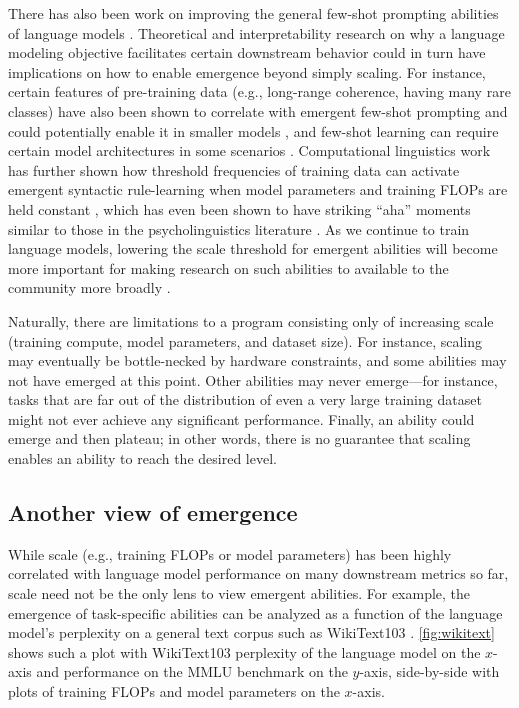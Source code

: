 There has also been work on improving the general few-shot prompting abilities of language models \citep[][\textit{inter alia}]{gao-etal-2021-making,schick-schutze-2021-just}. Theoretical and interpretability research \citep{wei2021pretrained,saunshi2020mathematical} on why a language modeling objective facilitates certain downstream behavior could in turn have implications on how to enable emergence beyond simply scaling. For instance, certain features of pre-training data (e.g., long-range coherence, having many rare classes) have also been shown to correlate with emergent few-shot prompting and could potentially enable it in smaller models \citep{xie2021explanation,chan2022data}, and few-shot learning can require certain model architectures in some scenarios \citep{chan2022data}. Computational linguistics work has further shown how threshold frequencies of training data can activate emergent syntactic rule-learning when model parameters and training FLOPs are held constant \citep{wei-etal-2021-frequency}, which has even been shown to have striking ``aha'' moments similar to those in the psycholinguistics literature \citep{abend2017bootstrapping,zhang-etal-2021-need}. As we continue to train language models, lowering the scale threshold for emergent abilities will become more important for making research on such abilities to available to the community more broadly \citep{bommasani2021opportunities,ganguli2022predictability,liang2022community-norms}.

Naturally, there are limitations to a program consisting only of increasing scale (training compute, model parameters, and dataset size). For instance, scaling may eventually be bottle-necked by hardware constraints, and some abilities may not have emerged at this point. Other abilities may never emerge---for instance, tasks that are far out of the distribution of even a very large training dataset might not ever achieve any significant performance. Finally, an ability could emerge and then plateau; in other words, there is no guarantee that scaling enables an ability to reach the desired level.

\subsection{Another view of emergence}\label{subsec:another-view}
While scale (e.g., training FLOPs or model parameters) has been highly correlated with language model performance on many downstream metrics so far, scale need not be the only lens to view emergent abilities. For example, the emergence of task-specific abilities can be analyzed as a function of the language model's perplexity on a general text corpus such as WikiText103 \citep{merity2016pointer}. 
\ref{fig:wikitext} shows such a plot with WikiText103 perplexity of the language model on the $x$-axis and performance on the MMLU benchmark on the $y$-axis, side-by-side with plots of training FLOPs and model parameters on the $x$-axis. 

